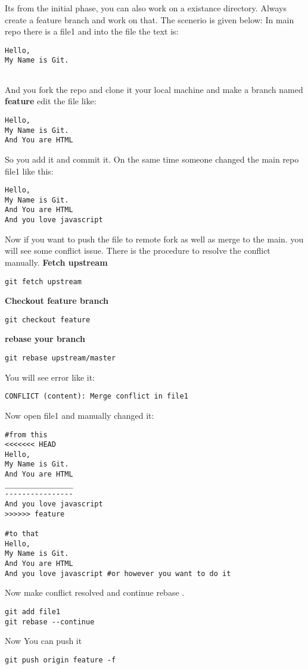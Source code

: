 \documentclass{article}
\begin{document}
Its from the initial phase, you can also work on a existance directory. 
Always create a feature branch and work on that. The scenerio is given below:
In main repo there is a file1 and into the file the text is: 
\begin{lstlisting}
Hello,
My Name is Git. 
	
\end{lstlisting}
And you fork the repo and clone it your local machine and make a branch named \textbf{feature} edit the file like:
\begin{lstlisting}
Hello,
My Name is Git. 
And You are HTML 
\end{lstlisting}
So you add it and commit it. On the same time someone changed the main repo file1 like this:
\begin{lstlisting}
Hello,
My Name is Git. 
And You are HTML
And you love javascript
\end{lstlisting}
Now if you want to push the file to remote fork as well as merge to the main. you will see some conflict issue. There is the procedure to resolve the conflict manually. 
\textbf{Fetch upstream}
\begin{lstlisting}
git fetch upstream
\end{lstlisting}
\textbf{Checkout feature branch}
\begin{lstlisting}
git checkout feature
\end{lstlisting}
\textbf{rebase your branch}
\begin{lstlisting}
git rebase upstream/master 
\end{lstlisting}
You will see error like it:
\begin{lstlisting}
CONFLICT (content): Merge conflict in file1
\end{lstlisting}
Now open file1 and manually changed it: 
\begin{lstlisting}
#from this 
<<<<<<< HEAD 
Hello,
My Name is Git. 
And You are HTML
________________
----------------
And you love javascript
>>>>>> feature 

#to that 
Hello,
My Name is Git. 
And You are HTML
And you love javascript #or however you want to do it
\end{lstlisting}
Now make conflict resolved and continue rebase . 
\begin{lstlisting}
git add file1
git rebase --continue
\end{lstlisting}
Now You can push it 
\begin{lstlisting}
git push origin feature -f 	
\end{lstlisting}
\end{document}
